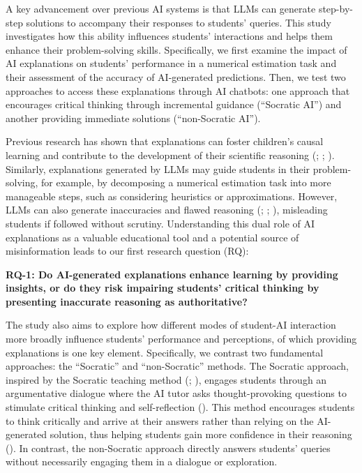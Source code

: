 \documentclass[
  11pt,
]{article}
\begin{document}
A key advancement over previous AI systems is that LLMs can generate step-by-step solutions to accompany their responses to students' queries. This study investigates how this ability influences students' interactions and helps them enhance their problem-solving skills. Specifically, we first examine the impact of AI explanations on students' performance in a numerical estimation task and their assessment of the accuracy of AI-generated predictions. Then, we test two approaches to access these explanations through AI chatbots: one approach that encourages critical thinking through incremental guidance (``Socratic AI'') and another providing immediate solutions (``non-Socratic AI'').

Previous research has shown that explanations can foster children's causal learning and contribute to the development of their scientific reasoning (; ; ). Similarly, explanations generated by LLMs may guide students in their problem-solving, for example, by decomposing a numerical estimation task into more manageable steps, such as considering heuristics or approximations. However, LLMs can also generate inaccuracies and flawed reasoning (; ; ), misleading students if followed without scrutiny. Understanding this dual role of AI explanations as a valuable educational tool and a potential source of misinformation leads to our first research question (RQ):

\textbf{RQ-1: Do AI-generated explanations enhance learning by providing insights, or do they risk impairing students' critical thinking by presenting inaccurate reasoning as authoritative?}

The study also aims to explore how different modes of student-AI interaction more broadly influence students' performance and perceptions, of which providing explanations is one key element. Specifically, we contrast two fundamental approaches: the ``Socratic'' and ``non-Socratic'' methods. The Socratic approach, inspired by the Socratic teaching method (; ), engages students through an argumentative dialogue where the AI tutor asks thought-provoking questions to stimulate critical thinking and self-reflection (). This method encourages students to think critically and arrive at their answers rather than relying on the AI-generated solution, thus helping students gain more confidence in their reasoning (). In contrast, the non-Socratic approach directly answers students' queries without necessarily engaging them in a dialogue or exploration.
\end{document}
